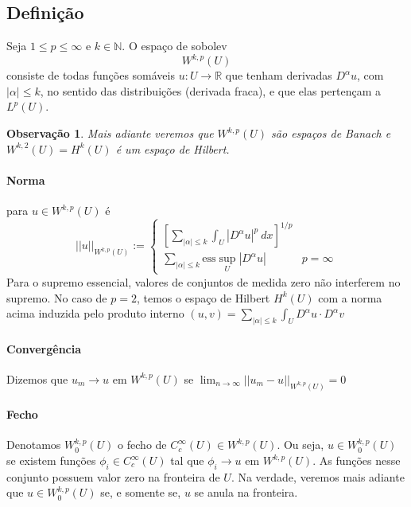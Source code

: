 \documentclass[a4paper, 11pt]{article}
\newcommand{\N}{\mathbb{N}}
\newcommand{\R}{\mathbb{R}}
\newtheorem{remark}{Observação}
\begin{document}
\subsection*{Definição}

Seja \( 1\leq p \leq \infty \) e \( k \in \N \). O espaço de sobolev \[ W^{k,p}(U) \] consiste de todas funções somáveis \( u:U\rightarrow\R \) que tenham derivadas \( D^\alpha u \), com \( |\alpha|\leq k \), no sentido das distribuições (derivada fraca), e que elas pertençam a \( L^p(U) \).

\begin{remark}
	Mais adiante veremos que $W^{k,p}(U)$ são espaços de Banach e $ W^{k,2}(U) = H^k(U)$ é um espaço de Hilbert.
\end{remark}
\paragraph{Norma} para \( u \in W^{k,p}(U) \) é \[ ||u||_{W^{k,p}(U)} := \begin{cases}
	\left[ \sum_{|\alpha|\leq k} \int_U \left| D^{\alpha} u\right|^p\ dx  \right]^{1/p}\\
	\sum_{|\alpha|\leq k} \text{ess}\sup_U \left| D^{\alpha} u \right| & p=\infty
\end{cases}\]Para o supremo essencial, valores de conjuntos de medida zero não interferem no supremo. No caso de \( p=2 \), temos o espaço de Hilbert \( H^k(U) \) com a norma acima induzida pelo produto interno \( (u,v) =\sum_{|\alpha|\leq k} \int_U D^{\alpha}u \cdot D^\alpha v   \)

\paragraph{Convergência} Dizemos que \( u_m \rightarrow u\) em \( W^{k,p}(U) \) se \( \lim_{n\rightarrow \infty} ||u_m - u||_{W^{k,p}(U)} =0\)

\paragraph{Fecho} Denotamos \( W^{k,p}_0 (U) \) o fecho de \( C^{\infty}_c(U) \in W^{k,p}(U) \). Ou seja, \( u \in W^{k,p}_0(U) \) se existem funções \( \phi_i \in C^{\infty}_c(U) \) tal que \( \phi_i \rightarrow u \) em \( W^{k,p}(U) \). As funções nesse conjunto possuem valor zero na fronteira de \( U \). Na verdade, veremos mais adiante que $u \in  W^{k,p}_0 (U)$ se, e somente se, $u$ se anula na fronteira.

\end{document}

